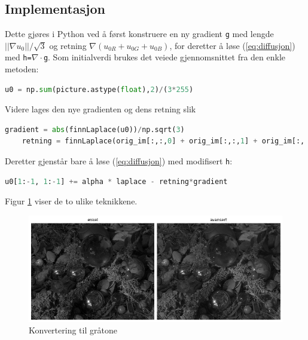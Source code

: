 \subsection{Implementasjon}
Dette gjøres i Python ved å først konstruere en ny gradient \texttt{g} med lengde $||\nabla u_0||/\sqrt{3}$ og retning $\nabla(u_{0R} + u_{0G} + u_{0B})$, for deretter å løse (\ref{eq:diffusjon}) med \texttt{h=$\nabla \cdot$g}.
\newline Som initialverdi brukes det veiede gjennomsnittet fra den enkle metoden:
\begin{lstlisting}[language=Python]
    u0 = np.sum(picture.astype(float),2)/(3*255)
\end{lstlisting}
Videre lages den nye gradienten og dens retning slik
\begin{lstlisting}[language=Python]
    gradient = abs(finnLaplace(u0))/np.sqrt(3)
    retning = finnLaplace(orig_im[:,:,0] + orig_im[:,:,1] + orig_im[:,:,2])
\end{lstlisting}
Deretter gjenstår bare å løse (\ref{eq:diffusjon}) med modifisert \texttt{h}:
\begin{lstlisting}[language=Python]
    u0[1:-1, 1:-1] += alpha * laplace - retning*gradient
\end{lstlisting}
Figur \ref{fig:graytone} viser de to ulike teknikkene.
\begin{figure}[H]
\begin{center}
    \includegraphics[width=1\columnwidth]{bilder/konvert.png}
    \caption{Konvertering til gråtone
    \label{fig:graytone}} 
\end{center}
\end{figure}




